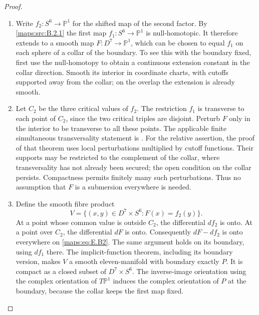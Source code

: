 \begin{proof}
\begin{enumerate}[label=\arabic*.,leftmargin=*]
\item Write $f_2:S^6\to\mathbb P^1$ for the shifted map of the second
factor. By \ref{maps:src:B.2.1} the first map $f_1:S^6\to\mathbb P^1$ is
null-homotopic. It therefore extends to a smooth map
$F:D^7\to\mathbb P^1$, which can be chosen to equal $f_1$ on
each sphere of a collar of the boundary. To see this with the
boundary fixed, first use the null-homotopy to obtain a continuous
extension constant in the collar direction. Smooth its interior
in coordinate charts, with cutoffs supported away from the collar;
on the overlap the extension is already smooth.

\item Let $C_2$ be the three critical values of $f_2$. The restriction
$f_1$ is transverse to each point of $C_2$, since the two critical
triples are disjoint. Perturb $F$ only in the interior to be
transverse to all these points. The applicable finite simultaneous
transversality statement is
\cite[Chapter 3, Section 2, Theorems 2.1 and 2.5]{rootHirsch76}.
For the relative assertion, the proof of that theorem uses local
perturbations multiplied by cutoff functions. Their supports may
be restricted to the complement of the collar, where
transversality has not already been secured; the open condition
on the collar persists. Compactness permits finitely many such
perturbations. Thus no assumption that $F$ is a submersion
everywhere is needed.

\item Define the smooth fibre product
\[
 V=\{(x,y)\in D^7\times S^6:F(x)=f_2(y)\}.
 \tag{E.B2}\label{maps:eq:E.B2}
\]
At a point whose common value is outside $C_2$, the differential
$df_2$ is onto. At a point over $C_2$, the differential $dF$ is
onto. Consequently $dF-df_2$ is onto everywhere on \eqref{maps:eq:E.B2}.
The same argument holds on its boundary, using $df_1$ there.
The implicit-function theorem, including its boundary version,
makes $V$ a smooth eleven-manifold with boundary exactly $P$.
It is compact as a closed subset of $D^7\times S^6$.
The inverse-image orientation using the complex orientation of
$T\mathbb P^1$ induces the complex orientation of $P$ at the
boundary, because the collar keeps the first map fixed.


\end{enumerate}
\end{proof}
